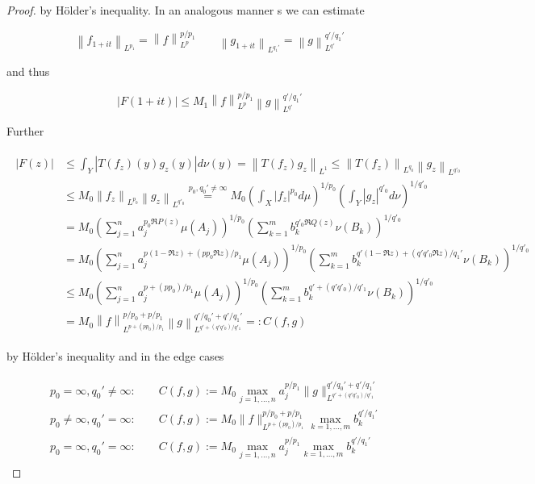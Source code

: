 \begin{proof}
by H\"older's inequality. In an analogous manner s we can estimate 
				
\begin{equation}
	\left\|f_{1 + it}\right\|_{L^{p_1}} = \left\|f\right\|_{L^p}^{p/p_1} \qquad \left\|g_{1 + it}\right\|_{L^{q_1'}} = \left\|g\right\|_{L^{q'}}^{q'/q_1'}
\end{equation}

and thus 
				
\begin{equation}
	\left| F(1 + it)\right| \leqslant M_1 \left\|f\right\|_{L^p}^{p/p_1}\left\|g\right\|_{L^{q'}}^{q'/q_1'}
\end{equation}	

Further 
		
\begin{gather*}
	\begin{aligned}
		\left| F(z)\right| &\leqslant \int_Y\left| T(f_z)(y)g_z(y)\right| d\nu(y) = \left\|T(f_z)g_z\right\|_{L^1} \leqslant \left\|T(f_z)\right\|_{L^{q_0}} \left\|g_z\right\|_{L^{q'_0}}\\
				&\leqslant M_0 \left\|f_z\right\|_{L^{p_0}} \left\|g_z\right\|_{L^{q'_0}} \overset{p_0,q_0' \neq \infty}{=} M_0 \left(\int_X \left| f_z \right|^{p_0}d\mu \right)^{1/p_0} \left(\int_Y \left| g_z \right|^{q'_0} d\nu\right)^{1/q'_0}\\
				&= M_0 \left( \sum\limits_{j = 1}^n a_j^{p_0\Re P(z)}\mu(A_j) \right)^{1/p_0} \left( \sum\limits_{k = 1}^m b_k^{q'_0\Re Q(z)} \nu(B_k) \right)^{1/q'_0}\\
				&= M_0 \left( \sum\limits_{j = 1}^n a_j^{p\left(1 - \Re z\right) + \left(pp_0\Re z\right)/p_1}\mu(A_j) \right)^{1/p_0} \left( \sum\limits_{k = 1}^m b_k^{q'\left(1 - \Re z\right) + \left(q'q'_0\Re z\right)/q_1'} \nu(B_k) \right)^{1/q'_0}\\
				&\leqslant M_0 \left( \sum\limits_{j = 1}^n a_j^{p + \left(pp_0\right)/p_1}\mu(A_j) \right)^{1/p_0} \left( \sum\limits_{k = 1}^m b_k^{q' + \left(q'q'_0\right)/q'_1} \nu(B_k) \right)^{1/q'_0}\\
				&= M_0 \left\|f\right\|_{L^{p + \left(pp_0\right)/p_1}}^{p/p_0 + p/p_1} \left\|g\right\|_{L^{q' + \left(q'q'_0\right)/q'_1}}^{q'/q_0' + q'/q_1'} =: C(f,g)
			\end{aligned}
		\end{gather*}
		
		
by H\"older's inequality and in the edge cases
		
\begin{gather*}
	\begin{aligned}
		&p_0 = \infty, q_0' \neq \infty: \qquad C(f,g) := M_0 \max_{j = 1,\hdots,n} a_j^{p/p_1} \|g\|_{L^{q' + (q'q'_0)/q'_1}}^{q'/q_0' + q'/q_1'}\\
		&p_0 \neq \infty, q_0' = \infty: \qquad C(f,g) :=  M_0 \|f\|_{L^{p + (pp_0)/p_1}}^{p/p_0 + p/p_1} \max_{k = 1,\hdots,m} b_k^{q'/q_1'}\\
		&p_0 = \infty, q_0' = \infty: \qquad C(f,g) := M_0 \max_{j = 1,\hdots,n} a_j^{p/p_1} \max_{k = 1,\hdots,m} b_k^{q'/q_1'}
	\end{aligned}
\end{gather*}
		

\end{proof}
